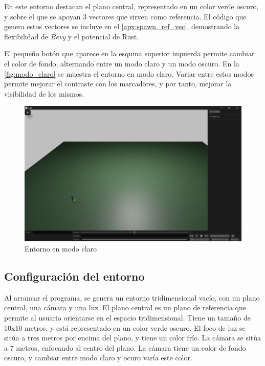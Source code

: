 En este entorno destacan el plano central, representado en un color verde oscuro, y sobre el que se apoyan 3 vectores que sirven como referencia. El código que genera estos vectores se incluye en el \autoref{apx:spawn_ref_vec}, demostrando la flexibilidad de \textit{Bevy} y el potencial de Rust. 

El pequeño botón que aparece en la esquina superior izquierda permite cambiar el color de fondo, alternando entre un modo claro y un modo oscuro. En la \autoref{fig:modo_claro} se muestra el entorno en modo claro. Variar entre estos modos permite mejorar el contraste con los marcadores, y por tanto, mejorar la visibilidad de los mismos.

\begin{figure}[H]
  \centering
  \includegraphics[width=\textwidth]{imagenes/modo_claro.png}
  \caption{Entorno en modo claro}
  \label{fig:modo_claro}
\end{figure}

\subsection{Configuración del entorno} \label{sec:bevy-configuracion}

Al arrancar el programa, se genera un entorno tridimensional vacío, con un plano central, una cámara y una luz. El plano central es un plano de referencia que permite al usuario orientarse en el espacio tridimensional. Tiene un tamaño de 10x10 metros, y está representado en un color verde oscuro. El foco de luz se sitúa a tres metros por encima del plano, y tiene un color frío. La cámara se sitúa a 7 metros, enfocando al centro del plano. La cámara tiene un color de fondo oscuro, y cambiar entre modo claro y ocuro varía este color.

